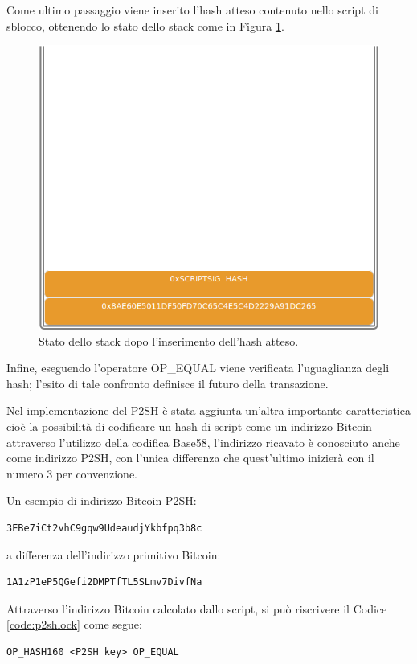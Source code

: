 Come ultimo passaggio viene inserito l’hash atteso contenuto nello script di sblocco, ottenendo lo stato dello stack come in Figura \ref{fig:stackp2sh03}.

\begin{figure}[H]
\begin{center}
\includegraphics[width=0.6\columnwidth]{images/script/p2sh/3.png}
\end{center}
\caption{Stato dello stack dopo l’inserimento dell’hash atteso.}
\label{fig:stackp2sh03}
\end{figure}

Infine, eseguendo l’operatore OP\_EQUAL viene verificata l’uguaglianza degli hash; l’esito di tale confronto definisce il futuro della transazione.

Nel implementazione del P2SH è stata aggiunta un’altra importante caratteristica cioè la possibilità di codificare un hash di script come un indirizzo Bitcoin attraverso l’utilizzo della codifica Base58, l’indirizzo ricavato è conosciuto anche come indirizzo P2SH, con l’unica differenza che quest'ultimo inizierà con il numero 3 per convenzione.

Un esempio di indirizzo Bitcoin P2SH:

\begin{lstlisting}[language=bitcoinscript, caption={Indirizzo Bitcoin P2SH.}]
3EBe7iCt2vhC9gqw9UdeaudjYkbfpq3b8c
\end{lstlisting}

a differenza dell’indirizzo primitivo Bitcoin:

\begin{lstlisting}[language=bitcoinscript, caption={Indirizzo Bitcoin primitivo.}]
1A1zP1eP5QGefi2DMPTfTL5SLmv7DivfNa
\end{lstlisting}

Attraverso l’indirizzo Bitcoin calcolato dallo script, si può riscrivere il Codice \ref{code:p2shlock} come segue:
\begin{lstlisting}[language=bitcoinscript, label={code:p2shlockwithkey}, caption={Script P2SH di blocco con Indirizzo Bitcoin P2SH.}]
OP_HASH160 <P2SH key> OP_EQUAL
\end{lstlisting}

